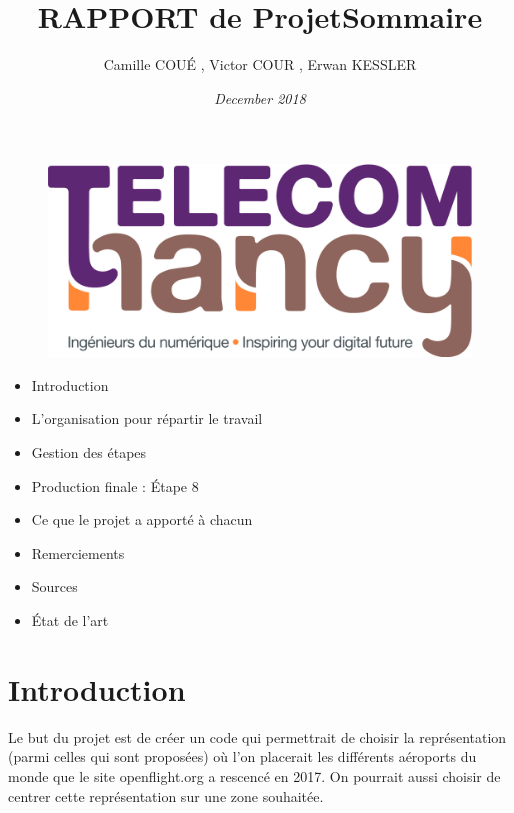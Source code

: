 \documentclass{article}
\begin{document}
\begin{figure}
\hspace{155pt}
\includegraphics[scale=0.1]{logo_TNCY.png}
\label{fig:logo_tncy}
\end{figure}

\title{\bf RAPPORT de Projet}
\author{ Camille COUÉ , Victor COUR , Erwan KESSLER}
\date{\it December 2018}


\maketitle


\title{\bf \Large Sommaire}
\begin{itemize}
    \item Introduction
    \item L'organisation pour répartir le travail 
    \item Gestion des étapes
    \item Production finale : Étape 8
    \item Ce que le projet a apporté à chacun
    \item Remerciements
    \item Sources
    \item État de l'art
\end{itemize}
\section { Introduction }



Le but du projet est de créer un code qui permettrait de choisir la représentation (parmi celles qui sont proposées) où l’on placerait les différents aéroports du monde que le site openflight.org a rescencé en 2017. On pourrait aussi choisir de centrer cette représentation sur une zone souhaitée.

\vspace{1\baselineskip}
\end{document}
